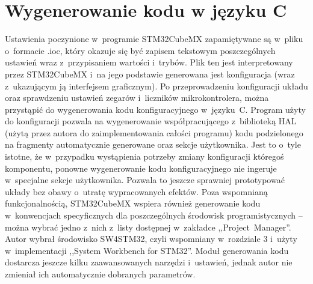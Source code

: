 \section{Wygenerowanie kodu w języku C}
\label{sec:configGenerate}
Ustawienia poczynione w~programie STM32CubeMX zapamiętywane są w~pliku o~formacie .ioc, który okazuje się być zapisem tekstowym poszczególnych ustawień wraz z~przypisaniem wartości i~trybów. Plik ten jest interpretowany przez STM32CubeMX i~na jego podstawie generowana jest konfiguracja (wraz z~ukazującym ją interfejsem graficznym). Po przeprowadzeniu konfiguracji układu oraz sprawdzeniu ustawień zegarów i~liczników mikrokontrolera, można przystąpić do wygenerowania kodu konfiguracyjnego w~języku~C. Program użyty do konfiguracji pozwala na wygenerowanie współpracującego z~biblioteką HAL (użytą przez autora do zaimplementowania całości programu) kodu podzielonego na fragmenty automatycznie generowane oraz sekcje użytkownika. Jest to o~tyle istotne, że w~przypadku wystąpienia potrzeby zmiany konfiguracji któregoś komponentu, ponowne wygenerowanie kodu konfiguracyjnego nie ingeruje w~specjalne sekcje użytkownika. Pozwala to jeszcze sprawniej prototypować układy bez obawy o~utratę wypracowanych efektów. Poza wspomnianą funkcjonalnością, STM32CubeMX wspiera również generowanie kodu w~konwencjach specyficznych dla poszczególnych środowisk programistycznych -- można wybrać jedno z~nich z~listy dostępnej w~zakładce ,,Project~Manager''. Autor wybrał środowisko SW4STM32, czyli wspomniany w~rozdziale 3 i~użyty w~implementacji ,,System Workbench for STM32''. Moduł generowania kodu dostarcza jeszcze kilku zaawansowanych narzędzi i~ustawień, jednak autor nie zmieniał ich automatycznie dobranych parametrów.
